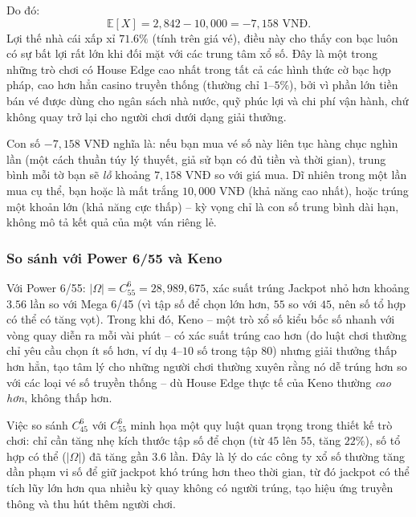 \documentclass[12pt,a4paper]{article}
\theoremstyle{coloredthm}
\theoremstyle{coloreddef}
\theoremstyle{remark}
\begin{document}
Do đó:
\[
\mathbb{E}[X] = 2{,}842 - 10{,}000 = -7{,}158 \text{ VNĐ}.
\]
Lợi thế nhà cái xấp xỉ $71.6\%$ (tính trên giá vé), điều này cho thấy con bạc luôn có sự bất lợi rất lớn khi đối mặt với các trung tâm xổ số. Đây là một trong những trò chơi có House Edge cao nhất trong tất cả các hình thức cờ bạc hợp pháp, cao hơn hẳn casino truyền thống (thường chỉ $1$--$5\%$), bởi vì phần lớn tiền bán vé được dùng cho ngân sách nhà nước, quỹ phúc lợi và chi phí vận hành, chứ không quay trở lại cho người chơi dưới dạng giải thưởng.

\begin{giaithich}
Con số $-7{,}158$ VNĐ nghĩa là: nếu bạn mua vé số này liên tục hàng chục nghìn lần (một cách thuần túy lý thuyết, giả sử bạn có đủ tiền và thời gian), trung bình mỗi tờ bạn sẽ \emph{lỗ} khoảng $7{,}158$ VNĐ so với giá mua. Dĩ nhiên trong một lần mua cụ thể, bạn hoặc là mất trắng $10{,}000$ VNĐ (khả năng cao nhất), hoặc trúng một khoản lớn (khả năng cực thấp) -- kỳ vọng chỉ là con số trung bình dài hạn, không mô tả kết quả của một ván riêng lẻ.
\end{giaithich}

\subsubsection{So sánh với Power 6/55 và Keno}

Với Power 6/55: $|\Omega| = C_{55}^6 = 28{,}989{,}675$, xác suất trúng Jackpot nhỏ hơn khoảng $3.56$ lần so với Mega 6/45 (vì tập số để chọn lớn hơn, $55$ so với $45$, nên số tổ hợp có thể có tăng vọt). Trong khi đó, Keno -- một trò xổ số kiểu bốc số nhanh với vòng quay diễn ra mỗi vài phút -- có xác suất trúng cao hơn (do luật chơi thường chỉ yêu cầu chọn ít số hơn, ví dụ $4$--$10$ số trong tập $80$) nhưng giải thưởng thấp hơn hẳn, tạo tâm lý cho những người chơi thường xuyên rằng nó dễ trúng hơn so với các loại vé số truyền thống -- dù House Edge thực tế của Keno thường \emph{cao hơn}, không thấp hơn.

\begin{ungdung}
Việc so sánh $C_{45}^6$ với $C_{55}^6$ minh họa một quy luật quan trọng trong thiết kế trò chơi: chỉ cần tăng nhẹ kích thước tập số để chọn (từ $45$ lên $55$, tăng $22\%$), số tổ hợp có thể ($|\Omega|$) đã tăng gần $3.6$ lần. Đây là lý do các công ty xổ số thường tăng dần phạm vi số để giữ jackpot khó trúng hơn theo thời gian, từ đó jackpot có thể tích lũy lớn hơn qua nhiều kỳ quay không có người trúng, tạo hiệu ứng truyền thông và thu hút thêm người chơi.
\end{ungdung}
\end{document}
